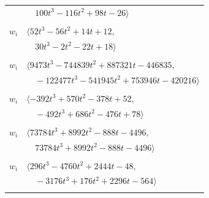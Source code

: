 \documentclass[11pt]{article}
\begin{document}
\begin{longtable}{@{}ll@{}}
 & $\quad 100t^{3}-116t^{2}+98t-26\rangle$\\
\addlinespace[2pt]
\multicolumn{2}{@{}p{0.97\textwidth}@{}}{$i=28$, $D_i=9$, $\rho_{ij}$: $16{:}1, \allowbreak 37{:}2, \allowbreak 39{:}2, \allowbreak 46{:}1, \allowbreak 49{:}1, \allowbreak 67{:}2, \allowbreak 72{:}2$}\\
$w_i$ & $\langle 52t^{3}-56t^{2}+14t+12,$\\
 & $\quad 30t^{3}-2t^{2}-22t+18\rangle$\\
\addlinespace[2pt]
\multicolumn{2}{@{}p{0.97\textwidth}@{}}{$i=29$, $D_i=2187$, $\rho_{ij}$: $5{:}2, \allowbreak 13{:}1, \allowbreak 17{:}2, \allowbreak 18{:}2, \allowbreak 20{:}1, \allowbreak 21{:}1, \allowbreak 27{:}2, \allowbreak 37{:}1, \allowbreak 39{:}1, \allowbreak 41{:}1, \allowbreak 46{:}2, \allowbreak 52{:}2, \allowbreak 54{:}1, \allowbreak 61{:}1, \allowbreak 74{:}2$}\\
$w_i$ & $\langle 9473t^{3}-744839t^{2}+887321t-446835,$\\
 & $\quad -122477t^{3}-541945t^{2}+753946t-420216\rangle$\\
\addlinespace[2pt]
\multicolumn{2}{@{}p{0.97\textwidth}@{}}{$i=30$, $D_i=9$, $\rho_{ij}$: $15{:}1, \allowbreak 22{:}1, \allowbreak 26{:}2, \allowbreak 31{:}2, \allowbreak 34{:}2, \allowbreak 37{:}2, \allowbreak 40{:}1, \allowbreak 51{:}1, \allowbreak 55{:}1$}\\
$w_i$ & $\langle -392t^{3}+570t^{2}-378t+52,$\\
 & $\quad -492t^{3}+686t^{2}-476t+78\rangle$\\
\addlinespace[2pt]
\multicolumn{2}{@{}p{0.97\textwidth}@{}}{$i=31$, $D_i=72$, $\rho_{ij}$: $1{:}1, \allowbreak 2{:}1, \allowbreak 3{:}2, \allowbreak 27{:}1, \allowbreak 30{:}1, \allowbreak 37{:}2, \allowbreak 41{:}2, \allowbreak 49{:}1, \allowbreak 69{:}2$}\\
$w_i$ & $\langle 73784t^{3}+8992t^{2}-888t-4496,$\\
 & $\quad 73784t^{3}+8992t^{2}-888t-4496\rangle$\\
\addlinespace[2pt]
\multicolumn{2}{@{}p{0.97\textwidth}@{}}{$i=32$, $D_i=12$, $\rho_{ij}$: $3{:}2, \allowbreak 11{:}2, \allowbreak 17{:}1, \allowbreak 22{:}1, \allowbreak 26{:}1, \allowbreak 27{:}1, \allowbreak 35{:}1, \allowbreak 49{:}2, \allowbreak 62{:}1$}\\
$w_i$ & $\langle 296t^{3}-4760t^{2}+2444t-48,$\\
 & $\quad -3176t^{3}+176t^{2}+2296t-564\rangle$\\
\addlinespace[2pt]
\multicolumn{2}{@{}p{0.97\textwidth}@{}}{$i=33$, $D_i=9$, $e_i=1$, $\rho_{ij}$: $2{:}2, \allowbreak 3{:}1, \allowbreak 9{:}2, \allowbreak 15{:}1, \allowbreak 18{:}1, \allowbreak 25{:}1, \allowbreak 35{:}2, \allowbreak 36{:}2, \allowbreak 44{:}1, \allowbreak 45{:}1, \allowbreak 46{:}1, \allowbreak 63{:}2, \allowbreak 68{:}2, \allowbreak 70{:}1$}\\

\end{longtable}
\end{document}
